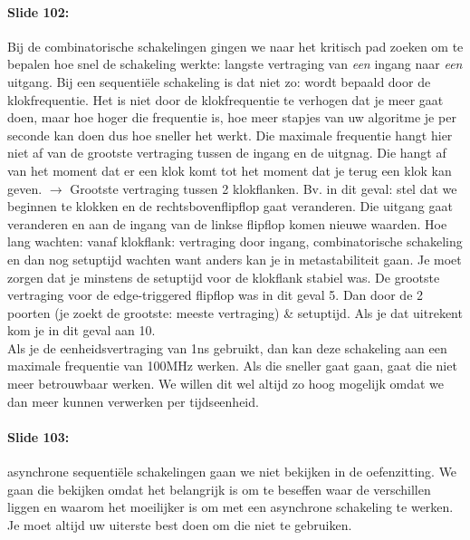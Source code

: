 \documentclass[10pt,a4paper]{book}
\begin{document}
\paragraph{Slide 102:} Bij de combinatorische schakelingen gingen we naar het kritisch pad zoeken om te bepalen hoe snel de schakeling werkte: langste vertraging van \emph{een} ingang naar \emph{een} uitgang. Bij een sequenti\"ele schakeling is dat niet zo: wordt bepaald door de klokfrequentie. Het is niet door de klokfrequentie te verhogen dat je meer gaat doen, maar hoe hoger die frequentie is, hoe meer stapjes van uw algoritme je per seconde kan doen dus hoe sneller het werkt. Die maximale frequentie hangt hier niet af van de grootste vertraging tussen de ingang en de uitgnag. Die hangt af van het moment dat er een klok komt tot het moment dat je terug een klok kan geven. $\rightarrow$ Grootste vertraging tussen 2 klokflanken.
Bv. in dit geval: stel dat we beginnen te klokken en de rechtsbovenflipflop gaat veranderen. Die uitgang gaat veranderen en aan de ingang van de linkse flipflop komen nieuwe waarden.
Hoe lang wachten: vanaf klokflank: vertraging door ingang, combinatorische schakeling en dan nog setuptijd wachten want anders kan je in metastabiliteit gaan. Je moet zorgen dat je minstens de setuptijd voor de klokflank stabiel was. De grootste vertraging voor de edge-triggered flipflop was in dit geval 5. Dan door de 2 poorten (je zoekt de grootste: meeste vertraging) \& setuptijd. Als je dat uitrekent kom je in dit geval aan 10.\\
Als je de eenheidsvertraging van 1ns gebruikt, dan kan deze schakeling aan een maximale frequentie van 100MHz werken. Als die sneller gaat gaan, gaat die niet meer betrouwbaar werken. We willen dit wel altijd zo hoog mogelijk omdat we dan meer kunnen verwerken per tijdseenheid.

\paragraph{Slide 103:} asynchrone sequenti\"ele schakelingen gaan we niet bekijken in de oefenzitting. We gaan die bekijken omdat het belangrijk is om te beseffen waar de verschillen liggen en waarom het moeilijker is om met een asynchrone schakeling te werken. Je moet altijd uw uiterste best doen om die niet te gebruiken.
\end{document}
